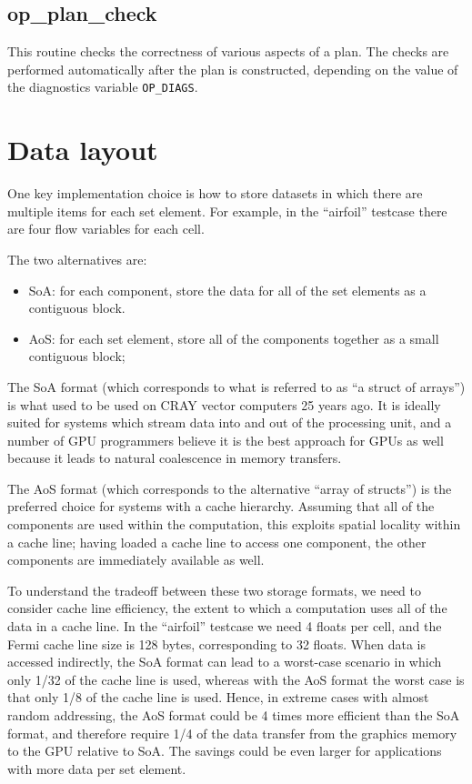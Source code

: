 \documentclass[12pt]{article}
\begin{document}
\subsection{op\_plan\_check}

This routine checks the correctness of various aspects of a plan.  The checks 
are performed automatically after the plan is constructed, depending on the
value of the diagnostics variable {\tt OP\_DIAGS}.

\newpage

\section{Data layout}

One key implementation choice is how to store datasets in which there are 
multiple items for each set element.  For example, in the ``airfoil'' testcase 
there are four flow variables for each cell.

The two alternatives are:
\begin{itemize}
\item SoA: for each component, store the data for all of the set elements
      as a contiguous block.
\item AoS: for each set element, store all of the components together
      as a small contiguous block;
\end{itemize}

The SoA format (which corresponds to what is referred to as 
``a struct of arrays'') is what used to be used on CRAY vector computers 
25 years ago.  It is ideally suited for systems which stream data into and 
out of the processing unit, and a number of GPU programmers believe it is 
the best approach for GPUs as well because it leads to natural coalescence 
in memory transfers.

The AoS format (which corresponds to the alternative ``array of structs'') 
is the preferred choice for systems with a cache hierarchy.  
Assuming that all of the components are used within the computation, this 
exploits spatial locality within a cache line; having loaded a cache line to 
access one component, the other components are immediately available as well.

To understand the tradeoff between these two storage formats, we need to consider
cache line efficiency, the extent to which a computation uses all of the data in
a cache line.  In the ``airfoil'' testcase we need 4 floats per cell, and the
Fermi cache line size is 128 bytes, corresponding to 32 floats.  When data is 
accessed indirectly, the SoA format can lead to a worst-case scenario in which
only 1/32 of the cache line is used, whereas with the AoS format the worst case
is that only 1/8 of the cache line is used.  Hence, in extreme cases with almost
random addressing, the AoS format could be 4 times more efficient than the SoA 
format, and therefore require 1/4 of the data transfer from the graphics memory
to the GPU relative to SoA.  The savings could be even larger for applications 
with more data per set element.
\end{document}
